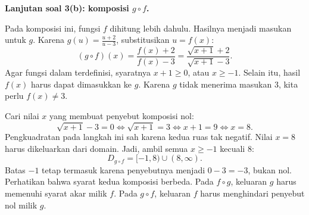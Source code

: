 \documentclass[11pt,a4paper]{article}
\begin{document}
\begin{enumerate}
        \newpage
        \textbf{Lanjutan soal 3(b): komposisi $g\circ f$.}

        Pada komposisi ini, fungsi $f$ dihitung lebih dahulu.
        Hasilnya menjadi masukan untuk $g$.
        Karena $g(u)=\frac{u+2}{u-3}$, substitusikan $u=f(x)$:
        \[
          (g\circ f)(x)=\frac{f(x)+2}{f(x)-3}
          =\boxed{\frac{\sqrt{x+1}+2}{\sqrt{x+1}-3}}.
        \]
        Agar fungsi dalam terdefinisi, syaratnya $x+1\ge0$, atau $x\ge-1$.
        Selain itu, hasil $f(x)$ harus dapat dimasukkan ke $g$.
        Karena $g$ tidak menerima masukan $3$, kita perlu $f(x)\ne3$.

        Cari nilai $x$ yang membuat penyebut komposisi nol:
        \[
          \sqrt{x+1}-3=0\iff\sqrt{x+1}=3
          \iff x+1=9\iff x=8.
        \]
        Pengkuadratan pada langkah ini sah karena kedua ruas tak negatif.
        Nilai $x=8$ harus dikeluarkan dari domain.
        Jadi, ambil semua $x\ge-1$ kecuali $8$:
        \[
          \boxed{D_{g\circ f}=[-1,8)\cup(8,\infty)}.
        \]
        Batas $-1$ tetap termasuk karena penyebutnya menjadi $0-3=-3$, bukan nol.
        Perhatikan bahwa syarat kedua komposisi berbeda.
        Pada $f\circ g$, keluaran $g$ harus memenuhi syarat akar milik $f$.
        Pada $g\circ f$, keluaran $f$ harus menghindari penyebut nol milik $g$.
\end{enumerate}
\end{document}
